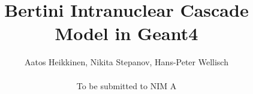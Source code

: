 \def \PIC {pictures}

\title{Bertini Intranuclear Cascade Model in {\sc Geant4} }

\author{Aatos Heikkinen, 
Nikita Stepanov, 
Hans-Peter Wellisch \\~ \\
{\small To be submitted to NIM A}}


\maketitle

\newpage
\tableofcontents
\newpage

  

 
 
%




\begin{appendix} 
%
\end{appendix} 





